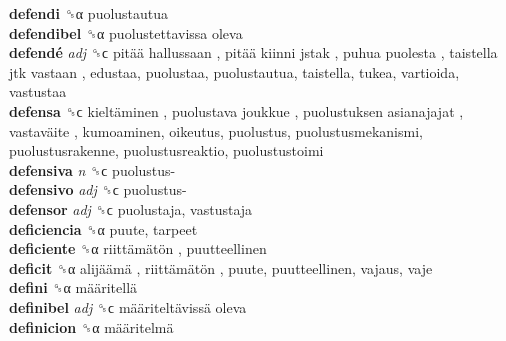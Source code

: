 \textbf{defendi} ␝α  puolustautua  \\
\textbf{defendibel} ␝α   puolustettavissa oleva   \\
\textbf{defendé} \emph{adj}  ␝ϲ   pitää hallussaan ,  pitää kiinni jstak ,  puhua puolesta ,  taistella jtk vastaan , edustaa, puolustaa, puolustautua, taistella, tukea, vartioida, vastustaa  \\
\textbf{defensa} ␝ϲ   kieltäminen ,  puolustava joukkue ,  puolustuksen asianajajat ,  vastaväite , kumoaminen, oikeutus, puolustus, puolustusmekanismi, puolustusrakenne, puolustusreaktio, puolustustoimi  \\
\textbf{defensiva} \emph{n}  ␝ϲ   puolustus-   \\
\textbf{defensivo} \emph{adj}  ␝ϲ   puolustus-   \\
\textbf{defensor} \emph{adj}  ␝ϲ  puolustaja, vastustaja  \\
\textbf{deficiencia} ␝α  puute, tarpeet  \\
\textbf{deficiente} ␝α   riittämätön , puutteellinen  \\
\textbf{deficit} ␝α   alijäämä ,  riittämätön , puute, puutteellinen, vajaus, vaje  \\
\textbf{defini} ␝α   määritellä   \\
\textbf{definibel} \emph{adj}  ␝ϲ   määriteltävissä oleva   \\
\textbf{definicion} ␝α   määritelmä   \\
